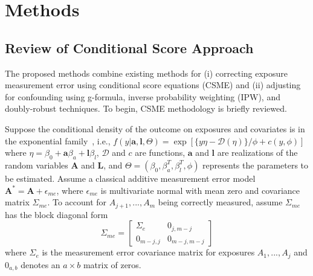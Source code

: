 \documentclass[useAMS,usenatbib,referee]{biom}
\begin{document}
\section{Methods}
\label{s:methods}

\subsection{Review of Conditional Score Approach}

The proposed methods combine existing methods for (i) correcting exposure measurement error using conditional score equations (CSME) and (ii) adjusting for confounding using g-formula, inverse probability weighting (IPW), and doubly-robust techniques. To begin, CSME methodology is briefly reviewed.

Suppose the conditional density of the outcome on exposures and covariates is in the exponential family~\citep{mccullagh1989}, i.e., $f(y | \bm{a}, \bm{l}, \Theta) = \exp [ \{y\eta - \mathcal{D}(\eta)\}/ \phi + c(y, \phi) ]$ where $\eta = \beta_{0} + \bm{a}\beta_{a} + \bm{l}\beta_{l}$, $\mathcal{D}$ and $c$ are functions, $\bm{a}$ and $\bm{l}$ are realizations of the random variables $\bm{A}$ and $\bm{L}$, and $\Theta = (\beta_{0}, \beta^{T}_{a}, \beta^{T}_{l}, \phi)$ represents the parameters to be estimated. Assume a classical additive measurement error model $\bm{A}^{*} = \bm{A} + \epsilon_{me}$, where $\epsilon_{me}$ is multivariate normal with mean zero and covariance matrix $\Sigma_{me}$. To account for $A_{j+1}, ...,  A_{m}$ being correctly measured, assume $\Sigma_{me}$ has the block diagonal form
\begin{equation*}
    \Sigma_{me} =
    \begin{bmatrix}
    \Sigma_{e} & 0_{j,m-j} \\
    0_{m-j,j} & 0_{m-j,m-j}
    \end{bmatrix}
\end{equation*}
where $\Sigma_{e}$ is the measurement error covariance matrix for exposures $A_{1},...,A_{j}$ and $0_{a,b}$ denotes an $a \times b$ matrix of zeros.
\end{document}
